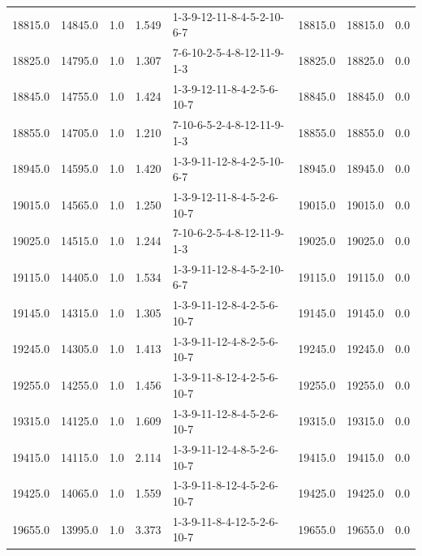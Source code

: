 \begin{tabular}{rrrrlrrr}
 18815.0 &  14845.0 &            1.0 &              1.549 &  1-3-9-12-11-8-4-5-2-10-6-7 &       18815.0 &         18815.0 &       0.0 \\
 18825.0 &  14795.0 &            1.0 &              1.307 &  7-6-10-2-5-4-8-12-11-9-1-3 &       18825.0 &         18825.0 &       0.0 \\
 18845.0 &  14755.0 &            1.0 &              1.424 &  1-3-9-12-11-8-4-2-5-6-10-7 &       18845.0 &         18845.0 &       0.0 \\
 18855.0 &  14705.0 &            1.0 &              1.210 &  7-10-6-5-2-4-8-12-11-9-1-3 &       18855.0 &         18855.0 &       0.0 \\
 18945.0 &  14595.0 &            1.0 &              1.420 &  1-3-9-11-12-8-4-2-5-10-6-7 &       18945.0 &         18945.0 &       0.0 \\
 19015.0 &  14565.0 &            1.0 &              1.250 &  1-3-9-12-11-8-4-5-2-6-10-7 &       19015.0 &         19015.0 &       0.0 \\
 19025.0 &  14515.0 &            1.0 &              1.244 &  7-10-6-2-5-4-8-12-11-9-1-3 &       19025.0 &         19025.0 &       0.0 \\
 19115.0 &  14405.0 &            1.0 &              1.534 &  1-3-9-11-12-8-4-5-2-10-6-7 &       19115.0 &         19115.0 &       0.0 \\
 19145.0 &  14315.0 &            1.0 &              1.305 &  1-3-9-11-12-8-4-2-5-6-10-7 &       19145.0 &         19145.0 &       0.0 \\
 19245.0 &  14305.0 &            1.0 &              1.413 &  1-3-9-11-12-4-8-2-5-6-10-7 &       19245.0 &         19245.0 &       0.0 \\
 19255.0 &  14255.0 &            1.0 &              1.456 &  1-3-9-11-8-12-4-2-5-6-10-7 &       19255.0 &         19255.0 &       0.0 \\
 19315.0 &  14125.0 &            1.0 &              1.609 &  1-3-9-11-12-8-4-5-2-6-10-7 &       19315.0 &         19315.0 &       0.0 \\
 19415.0 &  14115.0 &            1.0 &              2.114 &  1-3-9-11-12-4-8-5-2-6-10-7 &       19415.0 &         19415.0 &       0.0 \\
 19425.0 &  14065.0 &            1.0 &              1.559 &  1-3-9-11-8-12-4-5-2-6-10-7 &       19425.0 &         19425.0 &       0.0 \\
 19655.0 &  13995.0 &            1.0 &              3.373 &  1-3-9-11-8-4-12-5-2-6-10-7 &       19655.0 &         19655.0 &       0.0 \\

\end{tabular}
